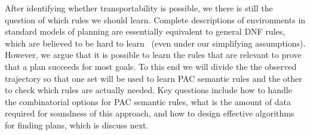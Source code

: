 \documentclass[12pt]{article}
\newcommand{\note}[1]{\textbf{\textit{#1}}}
\begin{document}

After identifying whether transportability is possible, we there is still the question of which rules we should  learn. Complete descriptions of environments in standard models of planning are essentially equivalent to general DNF rules, which are believed to be hard to learn~\cite{daniely2016dnf} (even under our simplifying assumptions). However, we argue that it is possible to learn the rules that are  relevant to prove that a plan succeeds for most goals. To this end we will divide the the observed trajectory so that one set will be used to learn PAC semantic rules and the other to check which rules are actually needed. Key questions include how to handle the combinatorial options for PAC semantic rules,  what is the amount of data required for soundness of this approach, and how to design effective algorithms for finding plans, which is discuss next.
\end{document}
